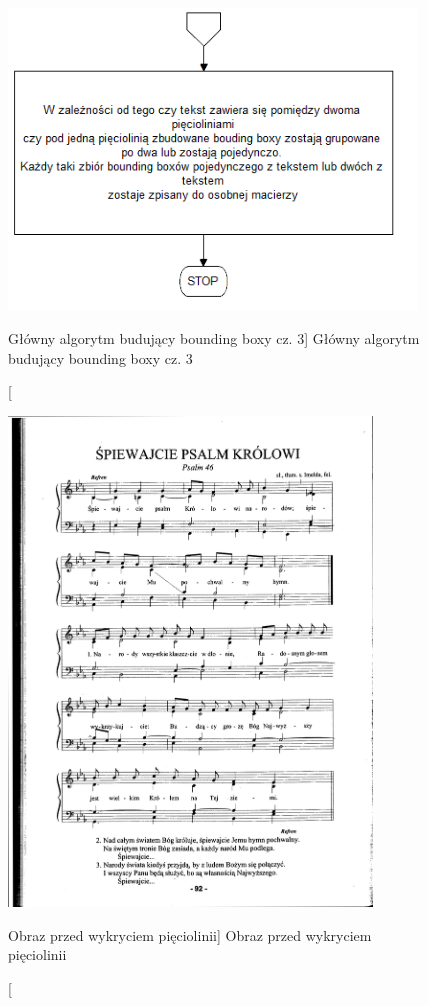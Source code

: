 \documentclass[a4paper,12pt]{article}
\begin{document}
		    \begin{figure}[!ht]  
			    \begin{center}
				    \includegraphics[height=8cm] {image//algorithm//majorProcesing_03.png} 
			    \end{center}
			    \caption
    			    [Główny algorytm budujący bounding boxy cz. 3]
    			    {Główny algorytm budujący bounding boxy cz. 3}  
		    \end{figure} 
		
    		\begin{figure}[!ht]  
			    \begin{center}
				    \includegraphics[height=13cm, frame] {image//exampleImage//004_a.png} 
			    \end{center}
			    \caption
    			    [Obraz przed wykryciem pięciolinii]  
    			    {Obraz przed wykryciem pięciolinii}  
		    \end{figure} 
		
\end{document}
